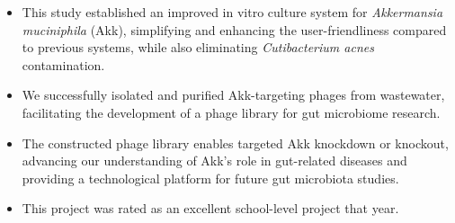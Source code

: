 \documentclass{resume}
\begin{document}
  \begin{itemize}
    \item This study established an improved in vitro culture system for \textit{Akkermansia muciniphila} (Akk), simplifying and enhancing the user-friendliness compared to previous systems, while also eliminating \textit{Cutibacterium acnes} contamination.
    \item We successfully isolated and purified Akk-targeting phages from wastewater, facilitating the development of a phage library for gut microbiome research.
    \item The constructed phage library enables targeted Akk knockdown or knockout, advancing our understanding of Akk's role in gut-related diseases and providing a technological platform for future gut microbiota studies.
    \item This project was rated as an excellent school-level project that year.
  \end{itemize}

\end{document}

